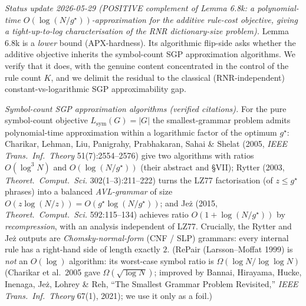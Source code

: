 \documentclass[
]{article}
\begin{document}
\emph{Status update 2026-05-29 (POSITIVE complement of Lemma 6.8k:
a polynomial-time $O(\log(N/g^\star))$-approximation for the additive
rule-cost objective, giving a tight-up-to-log characterisation of the
RNR dictionary-size problem).} Lemma 6.8k is a \emph{lower} bound
(APX-hardness). Its algorithmic flip-side asks whether the additive
objective inherits the symbol-count SGP approximation algorithms. We
verify that it does, with the genuine content concentrated in the
control of the rule count $K$, and we delimit the residual to the
classical (RNR-independent) constant-vs-logarithmic SGP approximability
gap.

\emph{Symbol-count SGP approximation algorithms (verified citations).}
For the pure symbol-count objective $L_{\mathrm{sym}}(G) = |G|$ the
smallest-grammar problem admits polynomial-time approximation within a
logarithmic factor of the optimum $g^\star$: Charikar, Lehman, Liu,
Panigrahy, Prabhakaran, Sahai \& Shelat (2005, \emph{IEEE Trans.\ Inf.\
Theory} 51(7):2554--2576) give two algorithms with ratios $O(\log^3 N)$
and $O(\log(N/g^\star))$ (their abstract and \S VII); Rytter (2003,
\emph{Theoret.\ Comput.\ Sci.} 302(1--3):211--222) turns the LZ77
factorisation (of $z \leq g^\star$ phrases) into a balanced
\emph{AVL-grammar} of size $O(z\log(N/z)) = O(g^\star\log(N/g^\star))$;
and Je\.z (2015, \emph{Theoret.\ Comput.\ Sci.} 592:115--134) achieves
ratio $O(1+\log(N/g^\star))$ by \emph{recompression}, with an analysis
independent of LZ77. Crucially, the Rytter and Je\.z outputs are
\emph{Chomsky-normal-form} (CNF / SLP) grammars: every internal rule has
a right-hand side of length exactly $2$. (RePair (Larsson--Moffat 1999)
is \emph{not} an $O(\log)$ algorithm: its worst-case symbol ratio is
$\Omega(\log N/\log\log N)$ (Charikar et al.\ 2005 gave
$\Omega(\sqrt{\log N})$; improved by Bannai, Hirayama, Hucke, Inenaga,
Je\.z, Lohrey \& Reh, ``The Smallest Grammar Problem Revisited,''
\emph{IEEE Trans.\ Inf.\ Theory} 67(1), 2021); we use it only as a
foil.)
\end{document}
